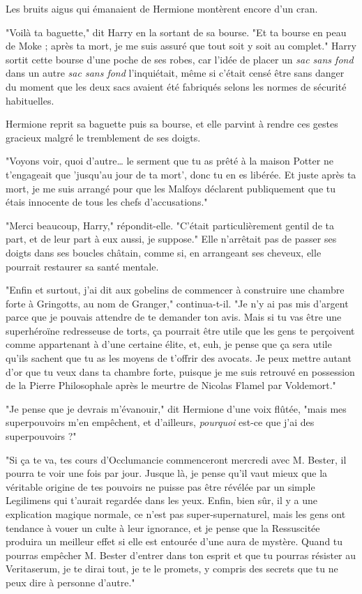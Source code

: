 Les bruits aigus qui émanaient de Hermione montèrent encore d'un cran.

"Voilà ta baguette," dit Harry en la sortant de sa bourse. "Et ta bourse en peau de Moke ; après ta mort, je me suis assuré que tout soit y soit au complet." Harry sortit cette bourse d'une poche de ses robes, car l'idée de placer un \emph{sac sans fond}  dans un autre \emph{sac sans fond}  l'inquiétait, même si c'était censé être sans danger du moment que les deux sacs avaient été fabriqués selons les normes de sécurité habituelles.

Hermione reprit sa baguette puis sa bourse, et elle parvint à rendre ces gestes gracieux malgré le tremblement de ses doigts.

"Voyons voir, quoi d'autre… le serment que tu as prêté à la maison Potter ne t'engageait que 'jusqu'au jour de ta mort', donc tu en es libérée. Et juste après ta mort, je me suis arrangé pour que les Malfoys déclarent publiquement que tu étais innocente de tous les chefs d'accusations."

"Merci beaucoup, Harry," répondit-elle. "C'était particulièrement gentil de ta part, et de leur part à eux aussi, je suppose." Elle n'arrêtait pas de passer ses doigts dans ses boucles châtain, comme si, en arrangeant ses cheveux, elle pourrait restaurer sa santé mentale.

"Enfin et surtout, j'ai dit aux gobelins de commencer à construire une chambre forte à Gringotts, au nom de Granger," continua-t-il. "Je n'y ai pas mis d'argent parce que je pouvais attendre de te demander ton avis. Mais si tu vas être une superhéroïne redresseuse de torts, ça pourrait être utile que les gens te perçoivent comme appartenant à d'une certaine élite, et, euh, je pense que ça sera utile qu'ils sachent que tu as les moyens de t'offrir des avocats. Je peux mettre autant d'or que tu veux dans ta chambre forte, puisque je me suis retrouvé en possession de la Pierre Philosophale après le meurtre de Nicolas Flamel par Voldemort."

"Je pense que je devrais m'évanouir," dit Hermione d'une voix flûtée, "mais mes superpouvoirs m'en empêchent, et d'ailleurs, \emph{pourquoi}  est-ce que j'ai des superpouvoirs ?"

"Si ça te va, tes cours d'Occlumancie commenceront mercredi avec M. Bester, il pourra te voir une fois par jour. Jusque là, je pense qu'il vaut mieux que la véritable origine de tes pouvoirs ne puisse pas être révélée par un simple Legilimens qui t'aurait regardée dans les yeux. Enfin, bien sûr, il y a une explication magique normale, ce n'est pas super-supernaturel, mais les gens ont tendance à vouer un culte à leur ignorance, et je pense que la Ressuscitée produira un meilleur effet si elle est entourée d'une aura de mystère. Quand tu pourras empêcher M. Bester d'entrer dans ton esprit et que tu pourras résister au Veritaserum, je te dirai tout, je te le promets, y compris des secrets que tu ne peux dire à personne d'autre."

